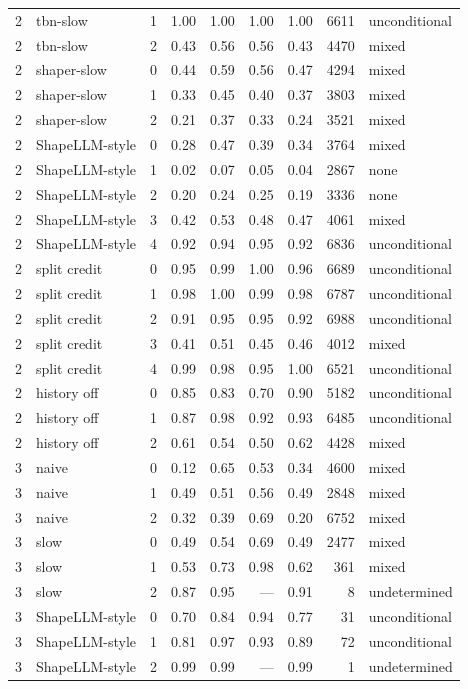 \begin{table}[ht]
\begin{tabular}{cllrrrrrl}
2 & tbn-slow & 1 & 1.00 & 1.00 & 1.00 & 1.00 & 6611 & unconditional \\
2 & tbn-slow & 2 & 0.43 & 0.56 & 0.56 & 0.43 & 4470 & mixed \\
2 & shaper-slow & 0 & 0.44 & 0.59 & 0.56 & 0.47 & 4294 & mixed \\
2 & shaper-slow & 1 & 0.33 & 0.45 & 0.40 & 0.37 & 3803 & mixed \\
2 & shaper-slow & 2 & 0.21 & 0.37 & 0.33 & 0.24 & 3521 & mixed \\
2 & ShapeLLM-style & 0 & 0.28 & 0.47 & 0.39 & 0.34 & 3764 & mixed \\
2 & ShapeLLM-style & 1 & 0.02 & 0.07 & 0.05 & 0.04 & 2867 & none \\
2 & ShapeLLM-style & 2 & 0.20 & 0.24 & 0.25 & 0.19 & 3336 & none \\
2 & ShapeLLM-style & 3 & 0.42 & 0.53 & 0.48 & 0.47 & 4061 & mixed \\
2 & ShapeLLM-style & 4 & 0.92 & 0.94 & 0.95 & 0.92 & 6836 & unconditional \\
2 & split credit & 0 & 0.95 & 0.99 & 1.00 & 0.96 & 6689 & unconditional \\
2 & split credit & 1 & 0.98 & 1.00 & 0.99 & 0.98 & 6787 & unconditional \\
2 & split credit & 2 & 0.91 & 0.95 & 0.95 & 0.92 & 6988 & unconditional \\
2 & split credit & 3 & 0.41 & 0.51 & 0.45 & 0.46 & 4012 & mixed \\
2 & split credit & 4 & 0.99 & 0.98 & 0.95 & 1.00 & 6521 & unconditional \\
2 & history off & 0 & 0.85 & 0.83 & 0.70 & 0.90 & 5182 & unconditional \\
2 & history off & 1 & 0.87 & 0.98 & 0.92 & 0.93 & 6485 & unconditional \\
2 & history off & 2 & 0.61 & 0.54 & 0.50 & 0.62 & 4428 & mixed \\
3 & naive & 0 & 0.12 & 0.65 & 0.53 & 0.34 & 4600 & mixed \\
3 & naive & 1 & 0.49 & 0.51 & 0.56 & 0.49 & 2848 & mixed \\
3 & naive & 2 & 0.32 & 0.39 & 0.69 & 0.20 & 6752 & mixed \\
3 & slow & 0 & 0.49 & 0.54 & 0.69 & 0.49 & 2477 & mixed \\
3 & slow & 1 & 0.53 & 0.73 & 0.98 & 0.62 & 361 & mixed \\
3 & slow & 2 & 0.87 & 0.95 & --- & 0.91 & 8 & undetermined \\
3 & ShapeLLM-style & 0 & 0.70 & 0.84 & 0.94 & 0.77 & 31 & unconditional \\
3 & ShapeLLM-style & 1 & 0.81 & 0.97 & 0.93 & 0.89 & 72 & unconditional \\
3 & ShapeLLM-style & 2 & 0.99 & 0.99 & --- & 0.99 & 1 & undetermined \\
\bottomrule
\end{tabular}
\end{table}
